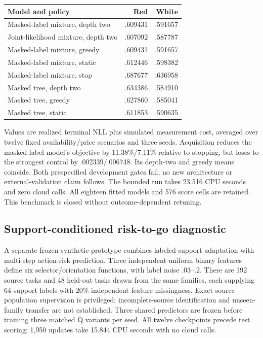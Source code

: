 \documentclass[10pt]{article}
\begin{document}
\begin{center}
\begin{tabular}{lrr}
\hline
Model and policy & Red & White \\
\hline
Masked-label mixture, depth two & .609431 & .591657 \\
Joint-likelihood mixture, depth two & .607092 & .587787 \\
Masked-label mixture, greedy & .609431 & .591657 \\
Masked-label mixture, static & .612446 & .598382 \\
Masked-label mixture, stop & .687677 & .636958 \\
Masked tree, depth two & .634386 & .584910 \\
Masked tree, greedy & .627860 & .585041 \\
Masked tree, static & .611853 & .590635 \\
\hline
\end{tabular}
\end{center}

Values are realized terminal NLL plus simulated measurement cost, averaged over twelve fixed availability/price scenarios and three seeds. Acquisition reduces the masked-label model's objective by 11.38\%/7.11\% relative to stopping, but loses to the strongest control by .002339/.006748. Its depth-two and greedy means coincide. Both prespecified development gates fail; no new architecture or external-validation claim follows. The bounded run takes 23.516 CPU seconds and zero cloud calls. All eighteen fitted models and 576 score cells are retained. This benchmark is closed without outcome-dependent retuning.

\subsection{Support-conditioned risk-to-go diagnostic}
A separate frozen synthetic prototype combines labeled-support adaptation with multi-step action-risk prediction. Three independent uniform binary features define six selector/orientation functions, with label noise .03--.2. There are 192 source tasks and 48 held-out tasks drawn from the same families, each supplying 64 support labels with 20\% independent feature missingness. Exact source population supervision is privileged; incomplete-source identification and unseen-family transfer are not established. Three shared predictors are frozen before training three matched Q variants per seed. All twelve checkpoints precede test scoring; 1,950 updates take 15.844 CPU seconds with no cloud calls.
\end{document}
